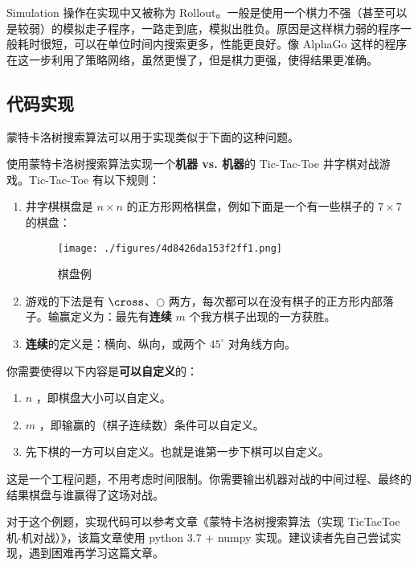 Simulation 操作在实现中又被称为 Rollout。一般是使用一个棋力不强（甚至可以是较弱）的模拟走子程序，一路走到底，模拟出胜负。原因是这样棋力弱的程序一般耗时很短，可以在单位时间内搜索更多，性能更良好。像 AlphaGo 这样的程序在这一步利用了策略网络，虽然更慢了，但是棋力更强，使得结果更准确。

\subsection{代码实现}
蒙特卡洛树搜索算法可以用于实现类似于下面的这种问题。
\begin{example}{}
使用蒙特卡洛树搜索算法实现一个\textbf{机器 vs. 机器}的 Tic-Tac-Toe 井字棋对战游戏。Tic-Tac-Toe 有以下规则：
\begin{enumerate}
\item 井字棋棋盘是 $n \times n$ 的正方形网格棋盘，例如下面是一个有一些棋子的 $7 \times 7$ 的棋盘：
\begin{figure}[ht]
\centering
\texttt{[image: ./figures/4d8426da153f2ff1.png]}
\caption{棋盘例} \label{fig_MCTS_2}
\end{figure}
\item 游戏的下法是有 $\cross$、$\bigcirc$ 两方，每次都可以在没有棋子的正方形内部落子。输赢定义为：最先有\textbf{连续} $m$ 个我方棋子出现的一方获胜。
\item \textbf{连续}的定义是：横向、纵向，或两个 $45^\circ$ 对角线方向。
\end{enumerate}

你需要使得以下内容是\textbf{可以自定义}的：
\begin{enumerate}
\item $n$ ，即棋盘大小可以自定义。
\item $m$ ，即输赢的（棋子连续数）条件可以自定义。
\item 先下棋的一方可以自定义。也就是谁第一步下棋可以自定义。
\end{enumerate}

这是一个工程问题，不用考虑时间限制。你需要输出机器对战的中间过程、最终的结果棋盘与谁赢得了这场对战。
\end{example}
对于这个例题，实现代码可以参考文章《蒙特卡洛树搜索算法（实现 TicTacToe 机-机对战）》，该篇文章使用 python 3.7 + numpy 实现。建议读者先自己尝试实现，遇到困难再学习这篇文章。